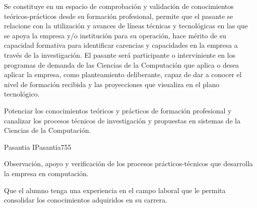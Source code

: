 \begin{syllabus}


\begin{justification}
Se constituye en un espacio de comprobación y validación de conocimientos teóricos-prácticos desde su formación profesional, permite que el pasante se relacione con la utilización y avances de líneas técnicas y tecnológicas en las que se apoya la empresa y/o institución para su operación, hace mérito de su capacidad formativa para identificar carencias y capacidades en la empresa a través de la investigación. El pasante será participante o interviniente en los programas de demanda de las Ciencias de la Computación que aplica o desea aplicar la empresa, como planteamiento deliberante, capaz de dar a conocer el nivel de formación recibida y las proyecciones que visualiza en el plano tecnológico.  
\end{justification}

\begin{goals}
\item Potenciar los conocimientos teóricos y prácticos de formación profesional y 
canalizar los procesos técnicos de investigación y propuestas en sistemas de la 
Ciencias de la Computación. 
\end{goals}

\begin{outcomes}
\end{outcomes}

\begin{unit}{Pasantia I}{Pasantia}{75}{5}
   \begin{topics}
      \item Observación, apoyo y verificación de los procesos prácticos-técnicos que desarrolla la empresa en computación.
   \end{topics}

   \begin{learningoutcomes}
      \item Que el alumno tenga una experiencia en el campo laboral que le permita consolidar los conocimientos adquiridos en su carrera.
   \end{learningoutcomes}
\end{unit}
   
\begin{coursebibliography}
\end{coursebibliography}
\end{syllabus}
